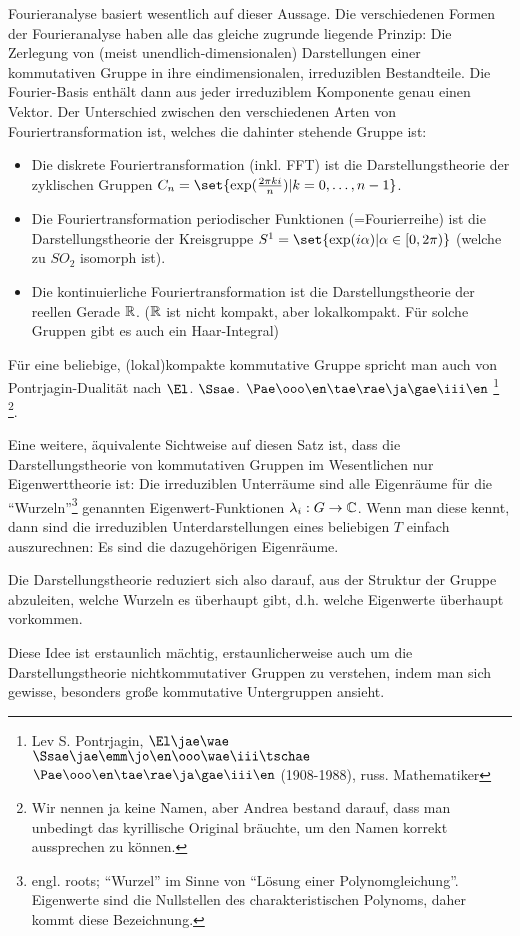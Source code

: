 \begin{remark}
Fourieranalyse basiert wesentlich auf dieser Aussage. Die verschiedenen Formen der Fourieranalyse haben alle das gleiche zugrunde liegende Prinzip: Die Zerlegung von (meist unendlich-dimensionalen) Darstellungen einer kommutativen Gruppe in ihre eindimensionalen, irreduziblen Bestandteile. Die Fourier-Basis enthält dann aus jeder irreduziblem Komponente genau einen Vektor. Der Unterschied zwischen den verschiedenen Arten von Fouriertransformation ist, welches die dahinter stehende Gruppe ist:

\begin{itemize}
\item Die diskrete Fouriertransformation (inkl. FFT) ist die Darstellungstheorie der zyklischen Gruppen $C_n = \set{\exp(\frac{2\pi k i}{n}) | k=0,\ldots,n-1}$.
\item Die Fouriertransformation periodischer Funktionen (=Fourierreihe) ist die Darstellungstheorie der Kreisgruppe $S^1 = \set{\exp(i\alpha) | \alpha\in[0,2\pi)}$ (welche zu $SO_2$ isomorph ist).
\item Die kontinuierliche Fouriertransformation ist die Darstellungstheorie der reellen Gerade $\mathbb{R}$. ($\mathbb{R}$ ist nicht kompakt, aber lokalkompakt. Für solche Gruppen gibt es auch ein Haar-Integral)
\end{itemize}

Für eine beliebige, (lokal)kompakte kommutative Gruppe spricht man auch von Pontrjagin-Dualität nach $\El$. $\Ssae$. $\Pae\ooo\en\tae\rae\ja\gae\iii\en$
\footnote{Lev S. Pontrjagin, $\El\jae\wae$ $\Ssae\jae\emm\jo\en\ooo\wae\iii\tschae$ $\Pae\ooo\en\tae\rae\ja\gae\iii\en$ (1908-1988), russ. Mathematiker} \footnote{Wir nennen ja keine Namen, aber Andrea bestand darauf, dass man unbedingt das kyrillische Original bräuchte, um den Namen korrekt aussprechen zu können.}.
\end{remark}

\begin{remark}
Eine weitere, äquivalente Sichtweise auf diesen Satz ist, dass die Darstellungstheorie von kommutativen Gruppen im Wesentlichen nur Eigenwerttheorie ist: Die irreduziblen Unterräume sind alle Eigenräume für die \enquote{Wurzeln}\footnote{engl. roots; \enquote{Wurzel} im Sinne von \enquote{Lösung einer Polynomgleichung}. Eigenwerte sind die Nullstellen des charakteristischen Polynoms, daher kommt diese Bezeichnung.} genannten Eigenwert-Funktionen $\lambda_i: G\to\mathbb{C}$. Wenn man diese kennt, dann sind die irreduziblen Unterdarstellungen eines beliebigen $T$ einfach auszurechnen: Es sind die dazugehörigen Eigenräume.

Die Darstellungstheorie reduziert sich also darauf, aus der Struktur der Gruppe abzuleiten, welche Wurzeln es überhaupt gibt, d.h. welche Eigenwerte überhaupt vorkommen.

\medbreak
Diese Idee ist erstaunlich mächtig, erstaunlicherweise auch um die Darstellungstheorie nichtkommutativer Gruppen zu verstehen, indem man sich gewisse, besonders große kommutative Untergruppen ansieht.
\end{remark}

